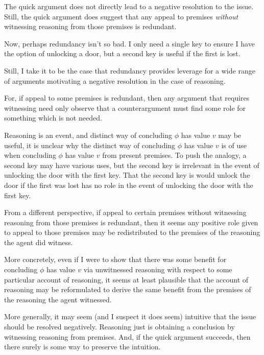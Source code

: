 \begin{note}
  The quick argument does not directly lead to a negative resolution to the issue.
  Still, the quick argument does suggest that any appeal to premises \emph{without} witnessing reasoning from those premises is redundant.

  Now, perhaps redundancy isn't so bad.
  I only need a single key to ensure I have the option of unlocking a door, but a second key is useful if the first is lost.

  Still, I take it to be the case that redundancy provides leverage for a wide range of arguments motivating a negative resolution in the case of reasoning.

  For, if appeal to some premises is redundant, then any argument that requires witnessing need only observe that a counterargument must find some role for something which is not needed.

  Reasoning is an event, and distinct way of concluding \(\phi\) has value \(v\) may be useful, it is unclear why the distinct way of concluding \(\phi\) has value \(v\) is of use when concluding \(\phi\) has value \(v\) from present premises.
  To push the analogy, a second key may have various uses, but the second key is irrelevant in the event of unlocking the door with the first key.
  That the second key is would unlock the door if the first was lost has no role in the event of unlocking the door with the first key.

  From a different perspective, if appeal to certain premises without witnessing reasoning from those premises is redundant, then it seems any positive role given to appeal to those premises may be redistributed to the premises of the reasoning the agent did witness.

  More concretely, even if I were to show that there was some benefit for concluding \(\phi\) has value \(v\) via unwitnessed reasoning with respect to some particular account of reasoning, it seems at least plausible that the account of reasoning may be reformulated to derive the same benefit from the premises of the reasoning the agent witnessed.

  More generally, it may seem (and I suspect it does seem) intuitive that the issue should be resolved negatively.
  Reasoning just is obtaining a conclusion by witnessing reasoning from premises.
  And, if the quick argument succeeds, then there surely is some way to preserve the intuition.
\end{note}


